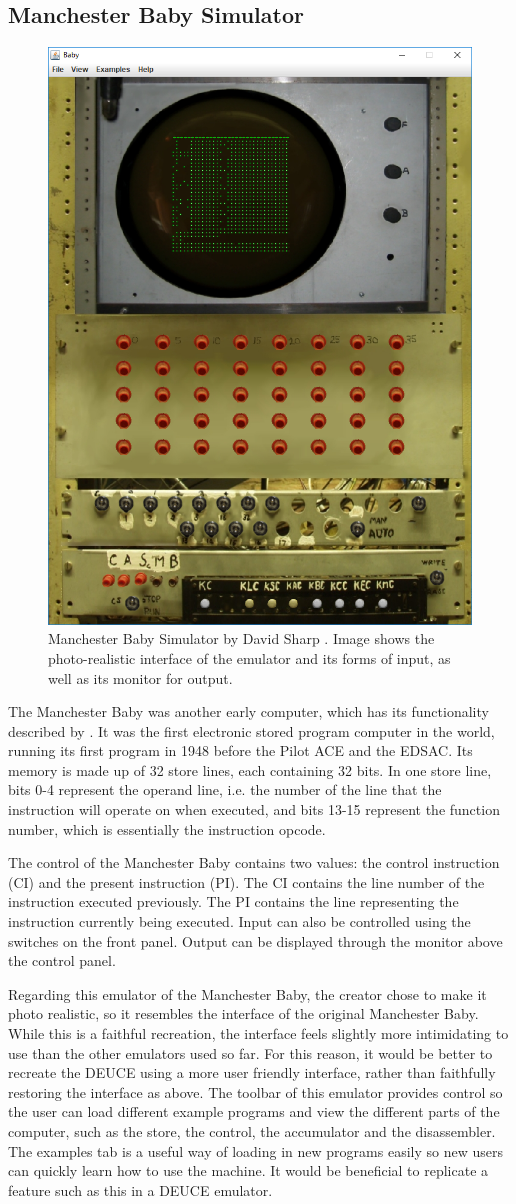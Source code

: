 \documentclass{l4proj}
\begin{document}
\subsection{Manchester Baby Simulator}
\begin{figure}[h!]
	\centering
	\includegraphics[width=0.5\linewidth]{images/baby-emu}
	\caption{Manchester Baby Simulator by David Sharp \citep{Baby08}. Image shows the photo-realistic interface of the emulator and its forms of input, as well as its monitor for output.}
	\label{fig:baby}
\end{figure}

The Manchester Baby was another early computer, which has its functionality described by \citet{BabyGuide08}. It was the first electronic stored program computer in the world, running its first program in 1948 before the Pilot ACE and the EDSAC. Its memory is made up of 32 store lines, each containing 32 bits. In one store line, bits 0-4 represent the operand line, i.e. the number of the line that the instruction will operate on when executed, and bits 13-15 represent the function number, which is essentially the instruction opcode.

The control of the Manchester Baby contains two values: the control instruction (CI) and the present instruction (PI). The CI contains the line number of the instruction executed previously. The PI contains the line representing the instruction currently being executed. Input can also be controlled using the switches on the front panel. Output can be displayed through the monitor above the control panel.

Regarding this emulator of the Manchester Baby, the creator chose to make it photo realistic, so it resembles the interface of the original Manchester Baby. While this is a faithful recreation, the interface feels slightly more intimidating to use than the other emulators used so far. For this reason, it would be better to recreate the DEUCE using a more user friendly interface, rather than faithfully restoring the interface as above.
The toolbar of this emulator provides control so the user can load different example programs and view the different parts of the computer, such as the store, the control, the accumulator and the disassembler. The examples tab is a useful way of loading in new programs easily so new users can quickly learn how to use the machine. It would be beneficial to replicate a feature such as this in a DEUCE emulator.
\end{document}
